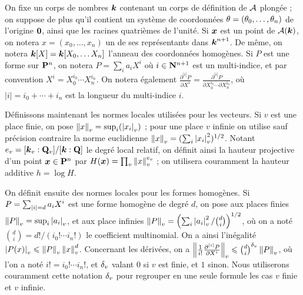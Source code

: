 On fixe un corps de nombres $\boldsymbol{k}$ contenant un corps de définition de $\mathcal{A}$
plongée ; on suppose de plus qu'il contient un système de coordonnées $\theta =
(\theta_0,\dots,\theta_n)$ de l'origine ${\boldsymbol{0}}$, ainsi que les racines quatrièmes de
l'unité. Si ${\boldsymbol{x}}$ est un point de $\mathcal{A}(\boldsymbol{k})$, on notera $x = (x_0, \dots,
x_n)$ un de ses représentants dans $\boldsymbol{k}^{n+1}$. De même, on notera $\boldsymbol{k}[X] =
\boldsymbol{k}[X_0, \dots X_n]$ l'anneau des coordonnées homogènes. Si $P$ est une forme
sur $\mathbf{P}^n$, on notera $P= \sum_i a_i X^i$ où $i \in \mathbf{N}^{n+1}$ est un
multi-indice, et par convention $X^i = X_0^{i_0}\cdots X_n^{i_n}$. On notera
également $\frac{\partial^{|i|} P}{\partial X^i} = \frac{\partial^{|i|}
  P}{\partial X_0^{i_0}\cdots \partial X_n^{i_n}}$, où $|i| = i_0 + \cdots +
i_n$ est la longueur du multi-indice $i$.

Définissons maintenant les normes locales utilisées pour les vecteurs. Si $v$
est une place finie, on pose $\left\lVert x\right\rVert_{v} = \sup_i(\left\lvert x_i\right\rvert_{v})$ ; pour une place $v$
infinie on utilise sauf précision contraire la norme euclidienne $\left\lVert x\right\rVert_{v} = (
\sum_i \left\lvert x_i\right\rvert_{v}^2 )^{1/2}$. Notant $e_v = [\boldsymbol{k}_v : \mathbf{Q}_v]/[\boldsymbol{k} : \mathbf{Q}]$ le
degré local relatif, on définit ainsi la hauteur projective d'un point ${\boldsymbol{x}}
\in \mathbf{P}^n$ par $H({\boldsymbol{x}}) = \prod_v \left\lVert x\right\rVert_{v}^{e_v}$ ; on utilisera couramment
la hauteur additive $h = \log H$.

On définit ensuite des normes locales pour les formes homogènes. Si $P =
\sum_{{|i|} =d} a_i X^i$ est une forme homogène de degré $d$, on pose aux
places finies $\left\lVert P\right\rVert_{v} = \sup_i \left\lvert a_i\right\rvert_{v}$, et aux place infinies $\left\lVert P\right\rVert_{v} =
\left( \sum_i \left\lvert a_i\right\rvert_{v}^2/\binom{d}{i} \right)^{1/2}$, où on a noté
$\binom{d}{i} = d!/(i_0!\cdots i_n!)$ le coefficient multinomial. On a ainsi
l'inégalité $\left\lvert P(x)\right\rvert_{v} \leqslant \left\lVert P\right\rVert_{v} \left\lVert x\right\rVert_{v}^d$. Concernant les dérivées, on a
$\left\lVert\frac{1}{i!}\frac{\partial^{|i|}P}{\partial X^i}\right\rVert_{v} \leqslant \binom{d}{i}^{\delta_v}
\left\lVert P\right\rVert_{v}$, où l'on a noté $i! = i_0! \cdots i_n!$, et ${\delta_v}$ valant $0$ si $v$
est finie, et $1$ sinon. Nous utiliserons couramment cette notation ${\delta_v}$ pour
regrouper en une seule formule les cas $v$ finie et $v$ infinie.

